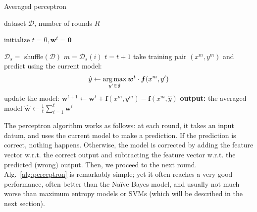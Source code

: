 \begin{algorithm}[t]

   \caption{\label{alg:perceptron} Averaged perceptron}

\begin{algorithmic}[1]

    dataset $\mathcal{D}$, number of rounds $R$

   \STATE initialize $t = 0, \boldsymbol{w}^t = \mathbf{0}$

         \STATE $\mathcal{D}_s =$ shuffle$(\mathcal{D})$
	\STATE $m = \mathcal{D}_s(i)$
        \STATE $t = t+1$
	\STATE take training pair $(x^m, y^m)$ and predict using the current model: 
	$$\hat{y}  \leftarrow \operatorname*{arg\,max}_{y'\in\mathcal{Y}} \boldsymbol{w}^t \cdot \boldsymbol{f}(x^m,y')$$
	\STATE update the model: 
	$\boldsymbol{w}^{t+1} \leftarrow \boldsymbol{w}^{t} +
        \boldsymbol{f}(x^m,y^m) - \boldsymbol{f}(x^m,\hat{y})$
        \ENDFOR
	\ENDFOR
   \STATE \textbf{output:} the averaged model $\hat{\boldsymbol{w}} \leftarrow \frac{1}{t}\sum_{i=1}^{t} \boldsymbol{w}^i$

\end{algorithmic}
 
%
%
%
%
%

\end{algorithm}

The perceptron algorithm works as follows: at each round, it takes an input datum, and uses the current model 
to make a prediction. If the prediction is correct, nothing happens. 
Otherwise, the model is corrected by adding the feature vector w.r.t. the correct output and 
subtracting the  feature vector w.r.t. the predicted (wrong) output. Then, we proceed to the next round. 
Alg.~\ref{alg:perceptron} is remarkably simple; yet it often reaches a very good performance, 
often better than the Na\"ive Bayes model, and usually not much worse than maximum entropy models or SVMs (which will be 
described in the next section). 

